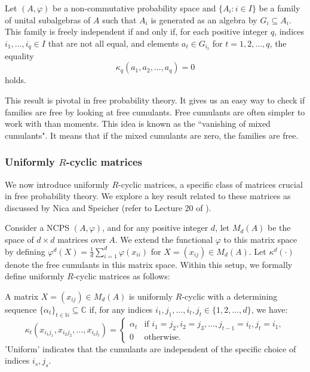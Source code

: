 \begin{theorem}
Let $(A, \varphi)$ be a non-commutative probability space and $\{A_i : i \in I\}$ be a family of unital subalgebras of $A$ such that $A_i$ is generated as an algebra by $G_i \subseteq A_i$. This family is freely independent if and only if, for each positive integer $q$, indices $i_1, \dots, i_q \in I$ that are not all equal, and elements $a_t \in G_{i_t}$ for $t = 1, 2, \dots, q$, the equality
\[
\kappa_q(a_1, a_2, \dots, a_q) = 0
\]
holds.
\end{theorem}

This result is pivotal in free probability theory. It gives us an easy way to check if families are free by looking at free cumulants. Free cumulants are often simpler to work with than moments. This idea is known as the ``vanishing of mixed cumulants". It means that if the mixed cumulants are zero, the families are free.

\subsubsection{Uniformly $R$-cyclic matrices}\label{uni-rcyclic}

We now introduce uniformly $R$-cyclic matrices, a specific class of matrices crucial in free probability theory. We explore a key result related to these matrices as discussed by Nica and Speicher (refer to Lecture 20 of \cite{nicaspec}). 

Consider a NCPS $(A, \varphi)$, and for any positive integer $d$, let $M_d(A)$ be the space of $d \times d$ matrices over $A$. We extend the functional $\varphi$ to this matrix space by defining $\varphi^d(X) = \frac{1}{d} \sum_{i=1}^d \varphi(x_{ii})$ for $X = (x_{ij}) \in M_d(A)$. Let $\kappa^d(\cdot)$ denote the free cumulants in this matrix space. Within this setup, we formally define uniformly $R$-cyclic matrices as follows:

\begin{definition}
A matrix $X = (x_{ij}) \in M_d(A)$ is uniformly $R$-cyclic with a determining sequence $\{\alpha_t\}_{t \in \mathbb{N}} \subseteq \mathbb{C}$ if, for any indices $i_1, j_1, \dots, i_t, j_t \in \{1, 2, \dots, d\}$, we have:
\[
\kappa_t(x_{i_1 j_1}, x_{i_2 j_2}, \dots, x_{i_t j_t}) = 
\begin{cases} 
\alpha_t & \text{if } i_1 = j_2, i_2 = j_3, \dots, j_{t-1} = i_t, j_t = i_1, \\
0 & \text{otherwise}.
\end{cases}
\]
'Uniform' indicates that the cumulants are independent of the specific choice of indices $i_s, j_s$.
\end{definition}

